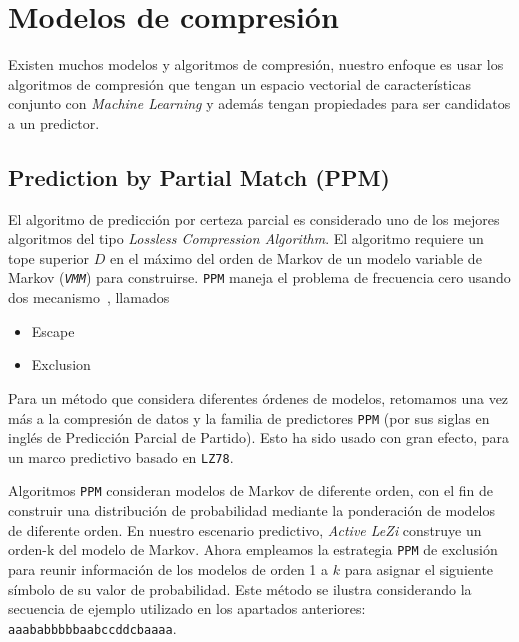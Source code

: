 


\vspace{1cm}
\section{Modelos de compresión}


Existen muchos modelos y algoritmos de compresión, nuestro enfoque es usar los algoritmos de compresión que tengan un espacio vectorial de características conjunto con \emph{Machine Learning} y además tengan propiedades para ser candidatos a un predictor. 


 
\subsection{Prediction by Partial Match (PPM)}
 
El algoritmo de predicción por certeza parcial es considerado uno de los mejores algoritmos del tipo \emph{Lossless Compression Algorithm}. El algoritmo requiere un tope superior $D$ en el máximo del orden de Markov de un modelo variable de Markov (\emph{\texttt{VMM}}) para construirse. 
\texttt{PPM} maneja el problema de frecuencia cero usando dos mecanismo~\cite{Begleiter2004},  llamados
	
	\begin{itemize}
			\setlength{\itemsep}{1pt}
			\setlength{\parskip}{0pt}
			\setlength{\parsep}{0pt}
		\item Escape
		\item Exclusion
	\end{itemize}
	
Para un método que considera diferentes órdenes de modelos, retomamos una vez más a la compresión de datos y la familia de predictores \texttt{PPM}  (por sus siglas en inglés de Predicción Parcial de Partido). Esto ha sido usado con gran efecto, para un marco predictivo basado en \texttt{LZ78}. 

Algoritmos  \texttt{PPM} consideran modelos de Markov de diferente orden,  con el fin de construir una distribución de probabilidad mediante la ponderación de modelos de diferente orden. En nuestro escenario predictivo, \emph{Active LeZi} construye un orden-k del modelo de Markov. Ahora empleamos la estrategia \texttt{PPM} de exclusión para reunir información de los modelos de orden 1 a $k$ para asignar el siguiente símbolo de su valor de probabilidad. Este método se ilustra considerando la secuencia de ejemplo utilizado en los apartados anteriores: \texttt{aaababbbbbaabccddcbaaaa}.

